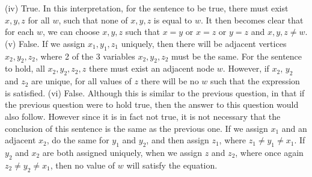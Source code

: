 \documentclass[12pt]{fphw}
\begin{document}
(iv) True. In this interpretation, for the sentence to be true, there must exist $x,y,z$ for all $w$, such that none of $x,y,z$ is equal to $w$. It then becomes clear that for each $w$, we can choose $x,y,z$ such that $x=y$ or $x = z$ or $y = z$ and $x,y,z \neq w$.\newline \newline
(v) False.  If we assign $x_1,y_1,z_1$ uniquely, then there will be adjacent vertices $x_2,y_2,z_2$, where 2 of the 3 variables $x_2,y_2,z_2$ must be the same. For the sentence to hold, all $x_2,y_2,z_2, z$ there must exist an adjacent node $w$. However, if $x_2$, $y_2$ and $z_2$ are unique, for all values of $z$ there will be no $w$ such that the expression is satisfied.   \newline \newline
(vi) False. Although this is similar to the previous question, in that if the previous question were to hold true, then the answer to this question would also follow. However since it is in fact not true, it is not necessary that the conclusion of this sentence is the same as the previous one. If we assign $x_1$ and an adjacent $x_2$, do the same for $y_1$ and $y_2$, and then assign $z_1$, where $z_1 \neq y_1 \neq x_1$. If $y_2$ and $x_2$ are both assigned uniquely, when we assign $z$ and $z_2$, where once again $z_2 \neq y_2 \neq x_1$, then no value of $w$ will satisfy the equation. \newline \newline
\end{document}
